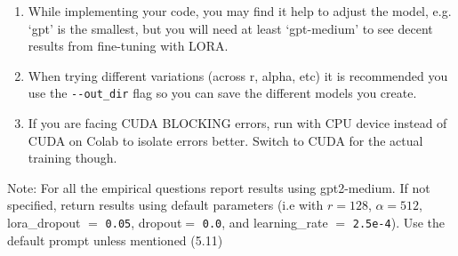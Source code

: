 \documentclass[11pt,addpoints,answers]{exam}
\begin{document}
\begin{questions}
\begin{enumerate}
    \item While implementing your code, you may find it help to adjust the model, e.g. `gpt' is the smallest, but you will need at least `gpt-medium' to see decent results from fine-tuning with LORA.
    \item When trying different variations (across r, alpha, etc) it is recommended you use the \lstinline{--out_dir} flag so you can save the different models you create. 
    \item If you are facing CUDA BLOCKING errors, run with CPU device instead of CUDA on Colab to isolate errors better. Switch to CUDA for the actual training though. 
\end{enumerate}
\clearpage

Note: For all the empirical questions report results using gpt2-medium. If not specified, return results using default parameters (i.e with $r=128$, $\alpha=512$, lora\_dropout $=$ \lstinline{0.05}, dropout$=$ \lstinline{0.0}, and learning\_rate $=$ \lstinline{2.5e-4}). Use the default prompt unless mentioned (5.11)
\end{questions}
\end{document}
